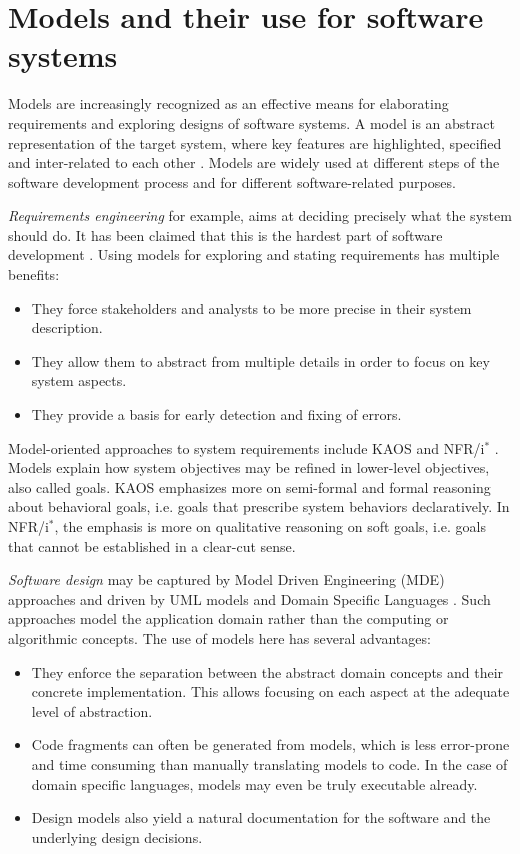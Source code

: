 \section{Models and their use for software systems}

Models are increasingly recognized as an effective means for elaborating requirements and exploring designs of software systems. A model is an abstract representation of the target system, where key features are highlighted, specified and inter-related to each other \cite{VanLamsweerde:2009}. Models are widely used at different steps of the software development process and for different software-related purposes.


\emph{Requirements engineering} for example, aims at deciding precisely what the system should do. It has been claimed that this is the hardest part of software development \cite{Brooks:1987}. Using models for exploring and stating requirements has multiple benefits:
\begin{itemize}
\item They force stakeholders and analysts to be more precise in their system description.
\item They allow them to abstract from multiple details in order to focus on key system aspects.
\item They provide a basis for early detection and fixing of errors.
\end{itemize}
Model-oriented approaches to system requirements include KAOS \cite{VanLamsweerde:2009} and NFR/i$^*$ \cite{Mylopoulos:1992, Yu:1993}. Models explain how system objectives may be refined in lower-level objectives, also called goals. KAOS emphasizes more on semi-formal and formal reasoning about behavioral goals, i.e. goals that prescribe system behaviors declaratively. In NFR/i$^*$, the emphasis is more on qualitative reasoning on soft goals, i.e. goals that cannot be established in a clear-cut sense.


\emph{Software design} may be captured by Model Driven Engineering (MDE) approaches and driven by UML models \cite{OMG:2004} and Domain Specific Languages \cite{VanDeursen:2000, Fowler:2010}. Such approaches model the application domain rather than the computing or algorithmic concepts. The use of models here has several advantages:
\begin{itemize}
\item They enforce the separation between the abstract domain concepts and their concrete implementation. This allows focusing on each aspect at the adequate level of abstraction.
\item Code fragments can often be generated from models, which is less error-prone and time consuming than manually translating models to code. In the case of domain specific languages, models may even be truly executable already. 
\item Design models also yield a natural documentation for the software and the underlying design decisions. 
\end{itemize}

